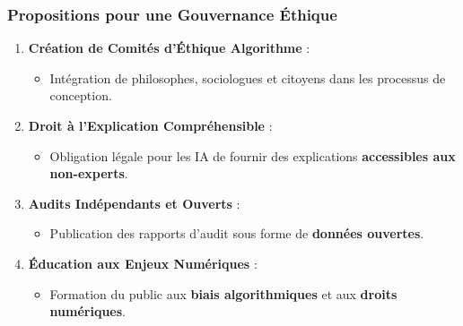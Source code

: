 \documentclass[a4paper,12pt]{report}
\begin{document}
	\subsubsection{Propositions pour une Gouvernance Éthique}
	\begin{enumerate}
		\item \textbf{Création de Comités d’Éthique Algorithme} :
		\begin{itemize}
			\item Intégration de philosophes, sociologues et citoyens dans les processus de conception.
		\end{itemize}
		\item \textbf{Droit à l’Explication Compréhensible} :
		\begin{itemize}
			\item Obligation légale pour les IA de fournir des explications \textbf{accessibles aux non-experts}.
		\end{itemize}
		\item \textbf{Audits Indépendants et Ouverts} :
		\begin{itemize}
			\item Publication des rapports d’audit sous forme de \textbf{données ouvertes}.
		\end{itemize}
		\item \textbf{Éducation aux Enjeux Numériques} :
		\begin{itemize}
			\item Formation du public aux \textbf{biais algorithmiques} et aux \textbf{droits numériques}.
		\end{itemize}
	\end{enumerate}
	
	
\end{document}
